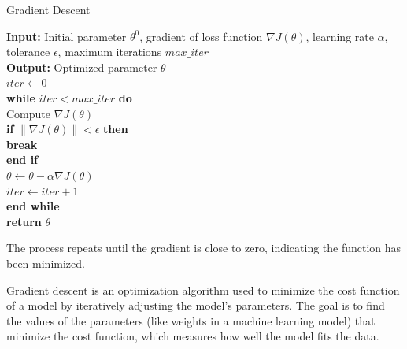 \documentclass[letterpaper,12pt,notitlepage,twoside]{report}
\begin{document}
\begin{algorithm}
\caption{Gradient Descent}
\begin{flushleft}
\textbf{Input:} Initial parameter $\theta^0$, gradient of loss function $\nabla J(\theta)$, learning rate $\alpha$, tolerance $\epsilon$, maximum iterations $max\_iter$\\
\textbf{Output:} Optimized parameter $\theta$\\

$iter \leftarrow 0$\\
\textbf{while} $iter < max\_iter$ \textbf{do}\\
\hspace{1em}Compute $\nabla J(\theta)$\\
\hspace{1em}\textbf{if} $\|\nabla J(\theta)\| < \epsilon$ \textbf{then}\\
\hspace{2em}\textbf{break}\\
\hspace{1em}\textbf{end if}\\
\hspace{1em}$\theta \leftarrow \theta - \alpha \nabla J(\theta)$\\
\hspace{1em}$iter \leftarrow iter + 1$\\
\textbf{end while}\\
\textbf{return} $\theta$
\end{flushleft}
\end{algorithm}

The process repeats until the gradient is close to zero, indicating the function has been minimized.

\begin{example}
Gradient descent is an optimization algorithm used to minimize the cost function of a model by iteratively adjusting the model's parameters. The goal is to find the values of the parameters (like weights in a machine learning model) that minimize the cost function, which measures how well the model fits the data.
\end{example}
\end{document}
